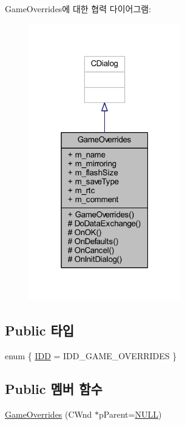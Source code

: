 Game\+Overrides에 대한 협력 다이어그램\+:\nopagebreak
\begin{figure}[H]
\begin{center}
\leavevmode
\includegraphics[width=187pt]{class_game_overrides__coll__graph}
\end{center}
\end{figure}
\subsection*{Public 타입}
\begin{DoxyCompactItemize}
\item 
enum \{ \mbox{\hyperlink{class_game_overrides_a0da33253aeb47bae8ed674bc210f2b12a37a4d9c26e79427fdda81e489146b745}{I\+DD}} = I\+D\+D\+\_\+\+G\+A\+M\+E\+\_\+\+O\+V\+E\+R\+R\+I\+D\+ES
 \}
\end{DoxyCompactItemize}
\subsection*{Public 멤버 함수}
\begin{DoxyCompactItemize}
\item 
\mbox{\hyperlink{class_game_overrides_affe74cfac71b81010d1ad7ce555d9853}{Game\+Overrides}} (C\+Wnd $\ast$p\+Parent=\mbox{\hyperlink{_system_8h_a070d2ce7b6bb7e5c05602aa8c308d0c4}{N\+U\+LL}})
\end{DoxyCompactItemize}
